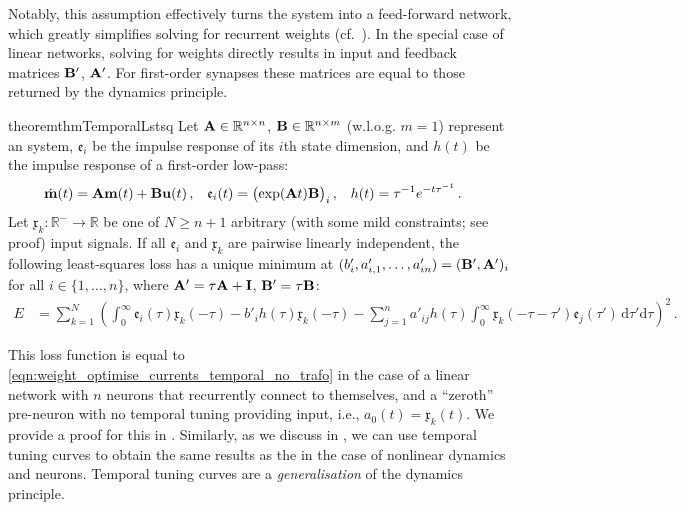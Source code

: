 Notably, this assumption effectively turns the system into a feed-forward network, which greatly simplifies solving for recurrent weights (cf.~).
In the special case of linear networks, solving for weights directly results in input and feedback matrices $\mathbf{B}'$, $\mathbf{A}'$.
For first-order synapses these matrices are equal to those returned by the \NEF dynamics principle.

\begin{restatable}{theorem}{thmTemporalLstsq}
	\label{thm:temporal_lstsq}
	Let $\mathbf{A} \in \mathbb{R}^{n \times n}$, $\mathbf{B} \in \mathbb{R}^{n \times m}$ (w.l.o.g. $m = 1$) represent an \LTI system, $\mathfrak{e}_i$ be the impulse response of its $i$th state dimension, and $h(t)$ be the impulse response of a first-order low-pass:
	\begin{align*}
		  \dot{\mathbf{m}}(t) &= \mathbf{A} \mathbf{m}(t) + \mathbf{B} \mathbf{u}(t)  \,, 
		& \mathfrak{e}_i(t) &= \big(\!\exp( \mathbf{A} t ) \mathbf{B} \big)_i \,,
		& h(t) &= \tau^{-1} e^{-t \tau^{-1}} \,.
	\end{align*}
	Let $\mathfrak{x}_k : \mathbb{R}^- \to \mathbb{R}$ be one of $N \geq n + 1$ arbitrary (with some mild constraints; see proof) input signals.
	If all $\mathfrak{e}_i$ and $\mathfrak{x}_k$ are pairwise linearly independent, the following least-squares loss has a unique minimum at $(b'_{i}, a'_{i, 1}, \ldots, a'_{in}) = ( \mathbf{B}', \mathbf{A}' )_i$ for all $i \in \{1, \ldots, n\}$, where $\mathbf{A}' = \tau \mathbf{A} + \mathbf{I}$, $\mathbf{B}' = \tau \mathbf{B}$:
	\begin{align*}
		E &=\sum_{k = 1}^{N} \left(
					\int_{0}^{\infty} \!\! \mathfrak{e}_i(\tau) \mathfrak{x}_k(-\tau)
		          - b'_{i} h(\tau) \mathfrak{x}_k(-\tau)
		          - \sum_{j=1}^n a'_{ij} h(\tau) \int_0^\infty \!\! \mathfrak{x}_k(-\tau - \tau') \mathfrak{e}_j(\tau') \, \mathrm{d}\tau' \mathrm{d}\tau \right)^2 \,.
	\end{align*}
\end{restatable}
\noindent This loss function is equal to \cref{eqn:weight_optimise_currents_temporal_no_trafo} in the case of a linear network with $n$ neurons that recurrently connect to themselves, and a \enquote{zeroth} pre-neuron with no temporal tuning providing input, i.e., $a_0(t) = \mathfrak{x}_k(t)$.
We provide a proof for this in .
Similarly, as we discuss in , we can use temporal tuning curves to obtain the same results as the \NEF in the case of nonlinear dynamics and neurons.
Temporal tuning curves are a \emph{generalisation} of the \NEF dynamics principle.

